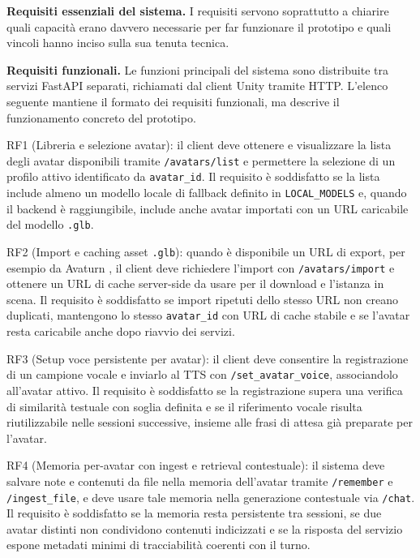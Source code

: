 \noindent\textbf{Requisiti essenziali del sistema.}
I requisiti servono soprattutto a chiarire quali capacità erano davvero necessarie per far funzionare il prototipo e quali vincoli hanno inciso sulla sua tenuta tecnica.

\textbf{Requisiti funzionali.} Le funzioni principali del sistema sono distribuite tra servizi FastAPI \cite{FastAPI2026} separati, richiamati dal client Unity tramite HTTP. L'elenco seguente mantiene il formato dei requisiti funzionali, ma descrive il funzionamento concreto del prototipo.

RF1 (Libreria e selezione avatar): il client deve ottenere e visualizzare la lista degli avatar disponibili tramite \texttt{/avatars/list} e permettere la selezione di un profilo attivo identificato da \texttt{avatar\_id}. Il requisito è soddisfatto se la lista include almeno un modello locale di fallback definito in \texttt{LOCAL\_MODELS} e, quando il backend è raggiungibile, include anche avatar importati con un URL caricabile del modello \texttt{.glb}.

RF2 (Import e caching asset \texttt{.glb}): quando è disponibile un URL di export, per esempio da Avaturn \cite{AvaturnDocs2026}, il client deve richiedere l'import con \texttt{/avatars/import} e ottenere un URL di cache server-side da usare per il download e l'istanza in scena. Il requisito è soddisfatto se import ripetuti dello stesso URL non creano duplicati, mantengono lo stesso \texttt{avatar\_id} con URL di cache stabile e se l'avatar resta caricabile anche dopo riavvio dei servizi.

RF3 (Setup voce persistente per avatar): il client deve consentire la registrazione di un campione vocale e inviarlo al TTS con \texttt{/set\_avatar\_voice}, associandolo all'avatar attivo. Il requisito è soddisfatto se la registrazione supera una verifica di similarità testuale con soglia definita e se il riferimento vocale risulta riutilizzabile nelle sessioni successive, insieme alle frasi di attesa già preparate per l'avatar.

RF4 (Memoria per-avatar con ingest e retrieval contestuale): il sistema deve salvare note e contenuti da file nella memoria dell'avatar tramite \texttt{/remember} e \texttt{/ingest\_file}, e deve usare tale memoria nella generazione contestuale via \texttt{/chat}. Il requisito è soddisfatto se la memoria resta persistente tra sessioni, se due avatar distinti non condividono contenuti indicizzati e se la risposta del servizio espone metadati minimi di tracciabilità coerenti con il turno.

